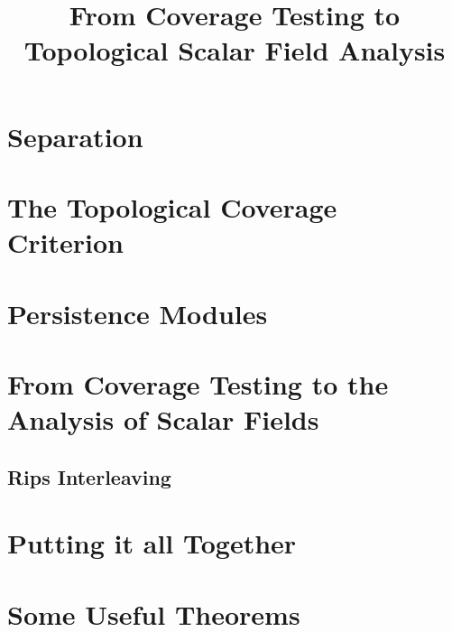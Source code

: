 \documentclass[12pt]{article}
\begin{document}
\title{From Coverage Testing to Topological Scalar Field Analysis}




% 

\section{Separation}


\clearpage
\section{The Topological Coverage Criterion}


\clearpage

\section{Persistence Modules}


\section{From Coverage Testing to the Analysis of Scalar Fields}


\subsection{Rips Interleaving}


\clearpage
\section{Putting it all Together}


\clearpage
\appendix
\section{Some Useful Theorems}





\end{document}

